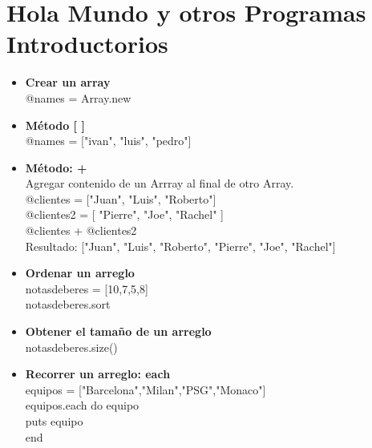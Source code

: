 \documentclass[11pt]{article} %
\begin{document}
\section{Hola Mundo y otros Programas Introductorios}
\begin{itemize}
      \item {\bf Crear un array}\\
	\hspace*{7mm} @names = Array.new\\
      \item {\bf Método [ ]} \\
	\hspace*{7mm} @names = ["ivan", "luis", "pedro"] \\
      \item {\bf Método: +}\\
	\hspace*{7mm} Agregar contenido de un Arrray al final de otro Array.\\
	\hspace*{7mm}@clientes = ["Juan", "Luis", "Roberto"]\\
	\hspace*{7mm}@clientes2 = [ "Pierre", "Joe", "Rachel" ]\\
	\hspace*{7mm}@clientes + @clientes2 \\
           \hspace*{7mm} Resultado: ["Juan", "Luis", "Roberto", "Pierre", "Joe", "Rachel"]\\
     \item {\bf Ordenar un arreglo}\\
	\hspace*{7mm} notasdeberes = [10,7,5,8]\\
	\hspace*{7mm} notasdeberes.sort\\
    \item  {\bf Obtener el tamaño de un arreglo}\\
	\hspace*{7mm} notasdeberes.size()\\

     \item  {\bf Recorrer un arreglo: each}\\
    	\hspace*{7mm} equipos = ["Barcelona","Milan","PSG","Monaco"]\\
	\hspace*{7mm} equipos.each do equipo\\
 	\hspace*{14mm} puts equipo\\
	\hspace*{7mm} end\\
	

\end{itemize}
\end{document}
